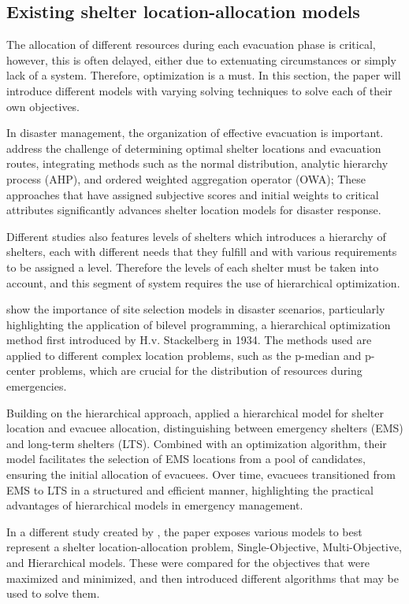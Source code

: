 \subsection{Existing shelter location-allocation models}
	The allocation of different resources during each evacuation phase is critical, however, this is often delayed, either due to extenuating circumstances or simply lack of a system. Therefore, optimization is a must. In this section, the paper will introduce different models with varying solving techniques to solve each of their own objectives.
	
	In disaster management, the organization of effective evacuation is important. \textcite{Yiying2022} address the challenge of determining optimal shelter locations and evacuation routes, integrating methods such as the normal distribution, analytic hierarchy process (AHP), and ordered weighted aggregation operator (OWA); These approaches that have assigned subjective scores and initial weights to critical attributes significantly advances shelter location models for disaster response.
	
	Different studies also features levels of shelters which introduces a hierarchy of shelters, each with different needs that they fulfill and with various requirements to be assigned a level. Therefore the levels of each shelter must be taken into account, and this segment of system requires the use of hierarchical optimization.
	
	\textcite{Yunjia2019} show the importance of site selection models in disaster scenarios, particularly highlighting the application of bilevel programming, a hierarchical optimization method first introduced by H.v. Stackelberg in 1934. The methods used are applied to different complex location problems, such as the p-median and p-center problems, which are crucial for the distribution of resources during emergencies. 
	
	Building on the hierarchical approach, \textcite{Xiujuan2019} applied a hierarchical model for shelter location and evacuee allocation, distinguishing between emergency shelters (EMS) and long-term shelters (LTS). Combined with an optimization algorithm, their model facilitates the selection of EMS locations from a pool of candidates, ensuring the initial allocation of evacuees. Over time, evacuees transitioned from EMS to LTS in a structured and efficient manner, highlighting the practical advantages of hierarchical models in emergency management. 
	
	In a different study created by \textcite{Yunjia2019}, the paper exposes various models to best represent a shelter location-allocation problem, Single-Objective, Multi-Objective, and Hierarchical models. These were compared for the objectives that were maximized and minimized, and then introduced different algorithms that may be used to solve them.
	
